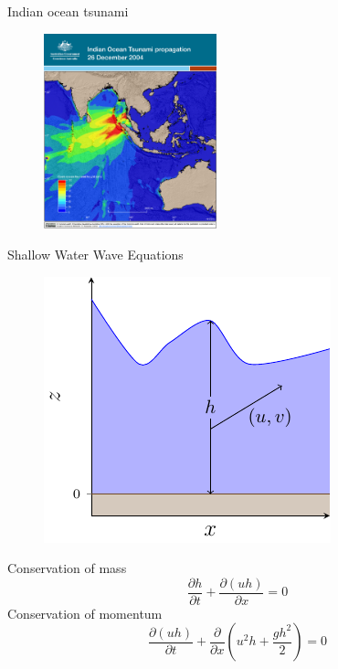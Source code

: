 \documentclass[pdf]{beamer}
\begin{document}
\begin{frame}{Indian ocean tsunami}
	\begin{figure}
		\includegraphics[width=5cm]{./Pictures/Introduction/IOT.jpg}
	\end{figure}
\end{frame}



\begin{frame}{Shallow Water Wave Equations}
	\hspace*{-1cm}%
	   	\begin{minipage}{.5\textwidth}
	   		\begin{figure}
	   			\includegraphics[]{./Pictures/Drawn/DepthAveraged.pdf}
	   		\end{figure}
	   	\end{minipage}%
	   	\hspace*{1cm}%
	   	\pause
   	\begin{minipage}{.5\textwidth}
   		Conservation of mass
   			\[
   			\dfrac{\partial h}{\partial t} + \dfrac{\partial (uh)}{\partial x} = 0
   			\]
   	    Conservation of momentum
   			\[
   			\dfrac{\partial (uh)}{\partial t} + \dfrac{\partial}{\partial x} \left ( u^2h + \dfrac{gh^2}{2}   \right )  = 0
   			\]
   	\end{minipage}
\end{frame}
\end{document}
